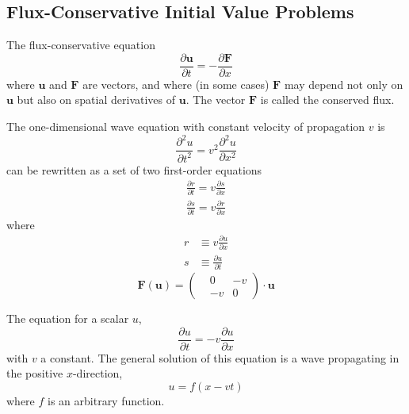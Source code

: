 \documentclass[12pt,a4paper]{article}
\renewcommand{\vec}[1]{\boldsymbol{#1}}
\begin{document}
\subsection{Flux-Conservative Initial Value Problems}
The flux-conservative equation
\begin{equation}
\frac{\partial \vec{u} }{\partial t} = - \frac{\partial \vec{F} }{\partial x} 
\end{equation}
where $\vec{u}$ and $\vec{F}$ are vectors, and where (in some cases) $\vec{F}$ may depend not only on $\vec{u}$ but also on spatial derivatives of $\vec{u}$. The vector $\vec{F}$ is called the conserved flux.

The one-dimensional wave equation with constant velocity of propagation $v$ is
\begin{equation}
\frac{\partial^2 u}{\partial t^2} = v^2 \frac{\partial^2 u}{\partial x^2}
\end{equation}
can be rewritten as a set of two first-order equations
\begin{align}
\frac{\partial r}{\partial t} = v\frac{\partial s}{\partial x} \\
\frac{\partial s}{\partial t} = v\frac{\partial r}{\partial x}
\end{align}
where
\begin{align}
r &\equiv v\frac{\partial u}{\partial x} \\
s &\equiv \frac{\partial u}{\partial t} 
\end{align}
\begin{equation}
\vec{F}(\vec{u}) = \left(
\begin{aligned}
&0 & -v \\
&-v & 0 
\end{aligned}
\right) \cdot \vec{u}
\end{equation}

The equation for a scalar $u$,
\begin{equation}
\frac{\partial u}{\partial t} = -v\frac{\partial u}{\partial x}
\end{equation}
with $v$ a constant. The general solution of this equation is a wave propagating in the positive $x$-direction,
\begin{equation}
u = f(x -vt)
\end{equation}
where $f$ is an arbitrary function.
\end{document}
